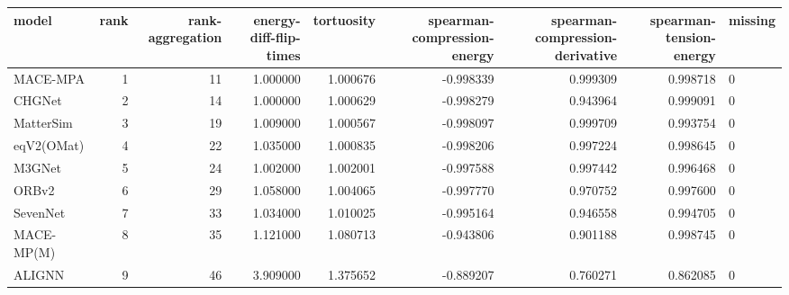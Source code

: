 \begin{tabular}{lrrrrrrrl}
\toprule
model & rank & rank-aggregation & energy-diff-flip-times & tortuosity & spearman-compression-energy & spearman-compression-derivative & spearman-tension-energy & missing \\
\midrule
MACE-MPA & 1 & 11 & 1.000000 & 1.000676 & -0.998339 & 0.999309 & 0.998718 & 0 \\
CHGNet & 2 & 14 & 1.000000 & 1.000629 & -0.998279 & 0.943964 & 0.999091 & 0 \\
MatterSim & 3 & 19 & 1.009000 & 1.000567 & -0.998097 & 0.999709 & 0.993754 & 0 \\
eqV2(OMat) & 4 & 22 & 1.035000 & 1.000835 & -0.998206 & 0.997224 & 0.998645 & 0 \\
M3GNet & 5 & 24 & 1.002000 & 1.002001 & -0.997588 & 0.997442 & 0.996468 & 0 \\
ORBv2 & 6 & 29 & 1.058000 & 1.004065 & -0.997770 & 0.970752 & 0.997600 & 0 \\
SevenNet & 7 & 33 & 1.034000 & 1.010025 & -0.995164 & 0.946558 & 0.994705 & 0 \\
MACE-MP(M) & 8 & 35 & 1.121000 & 1.080713 & -0.943806 & 0.901188 & 0.998745 & 0 \\
ALIGNN & 9 & 46 & 3.909000 & 1.375652 & -0.889207 & 0.760271 & 0.862085 & 0 \\
\bottomrule
\end{tabular}
